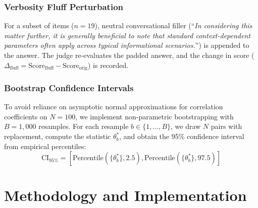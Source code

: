 \documentclass[11pt,a4paper]{article}
\begin{document}
\subsubsection{Verbosity Fluff Perturbation}
For a subset of items ($n=19$), neutral conversational filler (``\textit{In considering this matter further, it is generally beneficial to note that standard context-dependent parameters often apply across typical informational scenarios.}'') is appended to the answer. The judge re-evaluates the padded answer, and the change in score ($\Delta_{\text{fluff}} = \text{Score}_{\text{fluff}} - \text{Score}_{\text{orig}}$) is recorded.

\subsubsection{Bootstrap Confidence Intervals}
To avoid reliance on asymptotic normal approximations for correlation coefficients on $N=100$, we implement non-parametric bootstrapping with $B=1,000$ resamples. For each resample $b \in \{1, \dots, B\}$, we draw $N$ pairs with replacement, compute the statistic $\theta^*_b$, and obtain the 95\% confidence interval from empirical percentiles:
\begin{equation}
\text{CI}_{95\%} = \left[ \text{Percentile}\left(\{\theta^*_b\}, 2.5\right), \text{Percentile}\left(\{\theta^*_b\}, 97.5\right) \right]
\end{equation}

\section{Methodology and Implementation}
\end{document}
